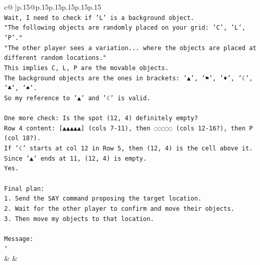 \documentclass{article}
\begin{document}
{\begin{supertabular}{c@{$\;$}|p{.15\linewidth}@{}p{.15\linewidth}p{.15\linewidth}p{.15\linewidth}p{.15\linewidth}p{.15\linewidth}}
{{{\\ 
\texttt{Wait, I need to check if 'L' is a background object.} \\
\texttt{"The following objects are randomly placed on your grid: 'C', 'L', 'P'."} \\
\texttt{"The other player sees a variation... where the objects are placed at different random locations."} \\
\texttt{This implies C, L, P are the movable objects.} \\
\texttt{The background objects are the ones in brackets: '▲', '⚑', '♦', '☾', '♣', '♠'.} \\
\texttt{So my reference to '▲' and '☾' is valid.} \\
\\ 
\texttt{One more check: Is the spot (12, 4) definitely empty?} \\
\texttt{Row 4 content: {[}▲▲▲▲▲{]} (cols 7{-}11), then ◌◌◌◌◌ (cols 12{-}16?), then P (col 18?).} \\
\texttt{If '☾' starts at col 12 in Row 5, then (12, 4) is the cell above it.} \\
\texttt{Since '▲' ends at 11, (12, 4) is empty.} \\
\texttt{Yes.} \\
\\ 
\texttt{Final plan:} \\
\texttt{1. Send the SAY command proposing the target location.} \\
\texttt{2. Wait for the other player to confirm and move their objects.} \\
\texttt{3. Then move my objects to that location.} \\
\\ 
\texttt{Message:} \\
\texttt{'} \\
            }
        }
    }
    & & \\ \\


\end{supertabular}}
\end{document}
